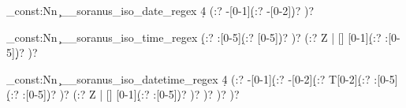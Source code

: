 %
%
%
% 
%

%
%

\regex_const:Nn \c__soranus_iso_date_regex
  {
    \A %
      \d{4} %
      (:?
        -[0-1]\d %
        (:?
          -[0-2]\d %
        )?
      )?
    \Z %
  }

\regex_const:Nn \c__soranus_iso_time_regex
  {
    \A
      [0-2]\d %
      (:?
        :[0-5]\d %
        (:?
          [0-5]\d %
        )?
      )?
      (:?
        Z | %
        [\+\-\−] %
        [0-1]\d %
        (:?
          :[0-5]\d %
        )?
      )?
    \Z
  }

\regex_const:Nn \c__soranus_iso_datetime_regex
  {
    \A %
      \d{4} %
      (:?
        -[0-1]\d %
        (:?
          -[0-2]\d %
          (:?
            T[0-2]\d %
            (:?
              :[0-5]\d %
              (:?
                :[0-5]\d %
              )?
            )?
            (:?
              Z | %
              [\+\-\−] %
              [0-1]\d %
              (:?
                :[0-5]\d %
              )?
            )?
          )?
        )?
      )?
    \Z %
  }
